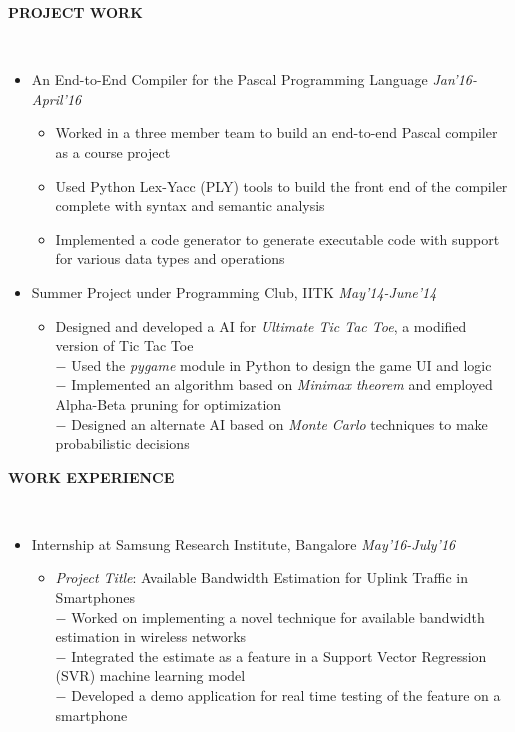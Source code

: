 \documentclass[a4paper,10pt]{article}
\newcommand{\isep}{-2 pt}
\newcommand{\lsep}{-0.5cm}
\newcommand{\resheading}[1]{{\small \colorbox{mygrey}{\begin{minipage}{0.975\textwidth}{\textbf{#1 \vphantom{p\^{E}}}}\end{minipage}}}}
\begin{document}
\resheading{\textbf{PROJECT WORK} }\\[\lsep]
\begin{itemize}
\item\noindent An End-to-End Compiler for the Pascal Programming Language
\hfill\emph{Jan'16-April'16}
\vspace{-2mm}
\begin{itemize}\itemsep \isep
\item \noindent Worked in a three member team to build an end-to-end Pascal compiler as a course project
\item \noindent Used Python Lex-Yacc (PLY) tools to build the front end of the compiler complete with syntax and semantic analysis
\item \noindent Implemented a code generator to generate executable code with support for various data types and operations
\end{itemize}
\item\noindent Summer Project under Programming Club, IITK \hfill\emph{May'14-June'14}
\vspace{-2mm}
\begin{itemize}\itemsep \isep
\item \noindent Designed and developed a AI for \emph{Ultimate Tic Tac Toe}, a modified version of Tic Tac Toe\\
$-$ Used the \emph{pygame} module in Python to design the game UI and logic\\
$-$ Implemented an algorithm based on \emph{Minimax theorem} and employed Alpha-Beta pruning for optimization\\
$-$ Designed an alternate AI based on \emph{Monte Carlo} techniques to make probabilistic decisions\\
\end{itemize}
\end{itemize}

\resheading{\textbf{WORK EXPERIENCE} }\\[\lsep]
\begin{itemize}
\item\noindent Internship at Samsung Research Institute, Bangalore
\hfill\emph{May'16-July'16}
\vspace{-2mm}
\begin{itemize}\itemsep \itemsep
\item\noindent \emph{Project Title}: Available Bandwidth Estimation for Uplink Traffic in Smartphones\\
$-$ Worked on implementing a novel technique for available bandwidth estimation in wireless networks\\
$-$ Integrated the estimate as a feature in a Support Vector Regression (SVR) machine learning model\\
$-$ Developed a demo application for real time testing of the feature on a smartphone\\
\end{itemize}
\end{itemize}
\end{document}
